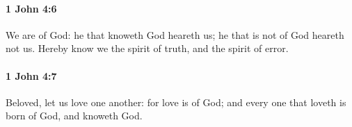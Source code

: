 		\paragraph{1 John 4:6} %
			\label{1JOHN-4-6}

			We are of God: he that knoweth God heareth us; he that is not of God heareth not us.  Hereby know we the spirit of truth, and the spirit of error.

			\begin{framed}
			\scriptsize
				\begin{compactdesc}
					\item[SBLG] 
				\end{compactdesc}
			\end{framed}

		\paragraph{1 John 4:7} %
			\label{1JOHN-4-7}

			Beloved, let us love one another: for love is of God; and every one that loveth is born of God, and knoweth God.

